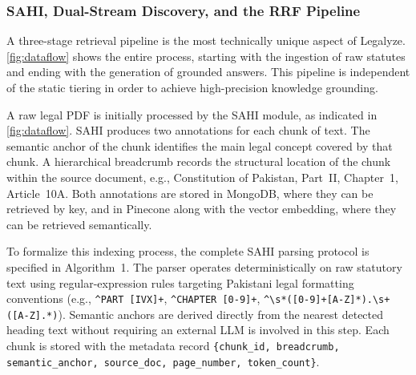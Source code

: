 \subsubsection{SAHI, Dual-Stream Discovery, and the RRF Pipeline}
\label{subsec:sahi_pipeline}

A three-stage retrieval pipeline is the most technically unique aspect of Legalyze.
\autoref{fig:dataflow} shows the entire process, starting with the ingestion of raw
statutes and ending with the generation of grounded answers. This pipeline is
independent of the static tiering in order to achieve high-precision knowledge
grounding.

A raw legal PDF is initially processed by the SAHI module, as indicated in
\autoref{fig:dataflow}. SAHI produces two annotations for each chunk of text. The
semantic anchor of the chunk identifies the main legal concept covered by that chunk.
A hierarchical breadcrumb records the structural location of the chunk within the
source document, e.g., Constitution of Pakistan, Part~II, Chapter~1, Article~10A.
Both annotations are stored in MongoDB, where they can be retrieved by key, and in
Pinecone along with the vector embedding, where they can be retrieved semantically.

To formalize this indexing process, the complete SAHI parsing protocol is specified in
Algorithm~1. The parser operates deterministically on raw statutory text using
regular-expression rules targeting Pakistani legal formatting conventions (e.g.,
\texttt{\^{}PART [IVX]+}, \texttt{\^{}CHAPTER [0-9]+},
\texttt{\^{}\textbackslash s*([0-9]+[A-Z]*).\textbackslash s+([A-Z].*)}). Semantic
anchors are derived directly from the nearest detected heading text without requiring an external LLM
is involved in this step. Each chunk is stored with the metadata record
\texttt{\{chunk\_id, breadcrumb, semantic\_anchor, source\_doc, page\_number,
token\_count\}}.

